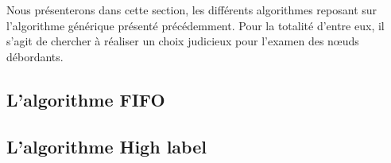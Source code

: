 Nous présenterons dans cette section, les différents algorithmes reposant sur l'algorithme générique
présenté précédemment. Pour la totalité d'entre eux, il s'agit de chercher à réaliser un choix
judicieux pour l'examen des n\oe uds débordants.

\subsection{L'algorithme FIFO}



\subsection{L'algorithme High label}
